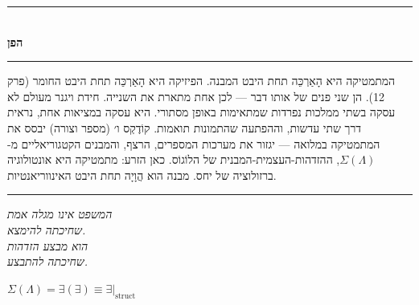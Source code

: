 \documentclass[10pt, openany, oneside]{book}
\renewcommand{\normalsize}{\fontsize{10}{13}\selectfont}
\begin{document}
\vspace{1.5em}


\begin{center}
    \rule{0.3\textwidth}{0.4pt}\\[0.5em]
    {\normalsize\bfseries\textsc{הפן}}\\[0.3em]
    \rule{0.3\textwidth}{0.4pt}
\end{center}

\vspace{1em}

\noindent המתמטיקה היא הָאַרְכֵּה תחת היבט המבנה. הפיזיקה היא הָאַרְכֵּה תחת היבט החומר (פרק 12). הן שני פנים של אותו דבר — לכן אחת מתארת את השנייה. חידת ויגנר מעולם לא עסקה בשתי ממלכות נפרדות שמתאימות באופן מסתורי. היא עסקה במציאות אחת, נראית דרך שתי עדשות, וההפתעה שהתמונות תואמות. קוֹדֶקְס ו׳ (מספר וצורה) יבסס את המתמטיקה במלואה — יגזור את מערכות המספרים, הרצף, והמבנים הקטגוריאליים מ-$\Sigma(\Lambda)$, ההזדהות-העצמית-המבנית של הלוֹגוֹס. כאן הזרע: מתמטיקה היא אונטולוגיה ברזולוציה של יחס. מבנה הוא הֲוָיָה תחת היבט האינווריאנטיות.

\vspace{2em}

\begin{center}
    \rule{0.15\textwidth}{0.3pt}
\end{center}

\vspace{0.5em}

\begin{center}
    \textit{%
    המשפט אינו מגלה אמת\\
    שחיכתה להימצא.}\\[0.8em]
    \textit{הוא מבצע הזדהות\\
    שחיכתה להתבצע.}
\end{center}

\vspace{0.5em}

\begin{center}
    $\Sigma(\Lambda) = \exists(\exists) \equiv \exists|_{\text{struct}}$
\end{center}

%
%
%
\end{document}
